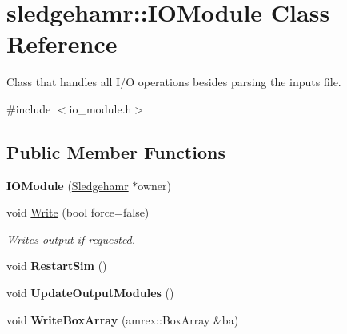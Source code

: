 \hypertarget{classsledgehamr_1_1IOModule}{}\section{sledgehamr\+:\+:I\+O\+Module Class Reference}
\label{classsledgehamr_1_1IOModule}


Class that handles all I/O operations besides parsing the inputs file.  




{\ttfamily \#include $<$io\+\_\+module.\+h$>$}

\subsection*{Public Member Functions}
\begin{DoxyCompactItemize}
\item 
\mbox{\label{classsledgehamr_1_1IOModule_aad737766170b477c2de5a30559798c07}} 
{\bfseries I\+O\+Module} (\mbox{\hyperlink{classsledgehamr_1_1Sledgehamr}{Sledgehamr}} $\ast$owner)
\item 
\mbox{\label{classsledgehamr_1_1IOModule_a00c504dbc9915e3fd10a0983cad67c5d}} 
void \mbox{\hyperlink{classsledgehamr_1_1IOModule_a00c504dbc9915e3fd10a0983cad67c5d}{Write}} (bool force=false)
\begin{DoxyCompactList}\small\item\em Writes output if requested. \end{DoxyCompactList}\item 
\mbox{\label{classsledgehamr_1_1IOModule_a6d40375399219df406fce38a63ce1ffb}} 
void {\bfseries Restart\+Sim} ()
\item 
\mbox{\label{classsledgehamr_1_1IOModule_a716cbe1da6249ecaaa4023d70ce2f2cc}} 
void {\bfseries Update\+Output\+Modules} ()
\item 
\mbox{\label{classsledgehamr_1_1IOModule_a2d235a92fd8afd2e35586b2c5da6e72f}} 
void {\bfseries Write\+Box\+Array} (amrex\+::\+Box\+Array \&ba)
\end{DoxyCompactItemize}
